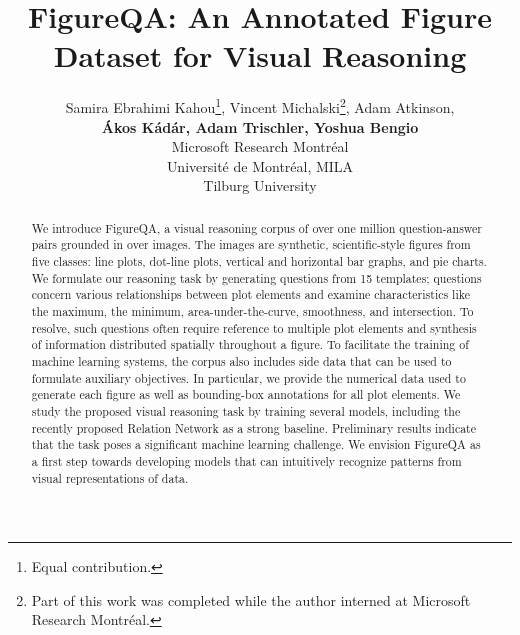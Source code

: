 \documentclass{article} \usepackage{iclr2018_workshop,times}
\title{FigureQA: An Annotated Figure Dataset for Visual Reasoning}
\author{
Samira Ebrahimi Kahou\thanks{Equal contribution.}, Vincent Michalski\thanks{Part of this work was completed while the author interned at Microsoft Research Montréal.}, Adam Atkinson, \\\textbf{Ákos Kádár, Adam Trischler, Yoshua Bengio}\\
Microsoft Research Montréal\\
Université de Montréal, MILA\\
Tilburg University
}
\begin{document}

\maketitle
\begin{abstract}
We introduce FigureQA, a visual reasoning corpus of over one million question-answer pairs grounded in over  images.
The images are synthetic, scientific-style figures from five classes: line plots, dot-line plots, vertical and horizontal bar graphs, and pie charts.
We formulate our reasoning task by generating questions from 15 templates; questions concern various relationships between plot elements and examine characteristics like the maximum, the minimum, area-under-the-curve, smoothness, and intersection.
To resolve, such questions often require reference to multiple plot elements and synthesis of information distributed spatially throughout a figure.
To facilitate the training of machine learning systems, the corpus also includes side data that can be used to formulate auxiliary objectives. In particular,
we provide the numerical data used to generate each figure as well as bounding-box annotations for all plot elements.
We study the proposed visual reasoning task by training several models, including the recently proposed Relation Network as a strong baseline.
Preliminary results indicate that the task poses a significant machine learning challenge.
We envision FigureQA as a first step towards developing models that can intuitively recognize patterns from visual representations of data.
\end{abstract}
\end{document}
